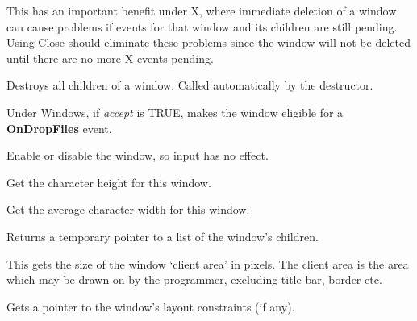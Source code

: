 This has an important benefit under X, where immediate deletion of a window can cause problems if events
for that window and its children are still pending. Using Close should eliminate these problems
since the window will not be deleted until there are no more X events pending.



Destroys all children of a window.  Called automatically by the destructor.

\label{wxwindowdragacceptfiles}


Under Windows, if {\it accept} is TRUE, makes the window eligible for a {\bf OnDropFiles} event.



Enable or disable the window, so input has no effect.



Get the character height for this window.



Get the average character width for this window.



Returns a temporary pointer to a list of the window's children.

\label{wingetclientsize}


This gets the size of the window `client area' in pixels.  The client area is the
area which may be drawn on by the programmer, excluding title bar, border etc.

\label{wxwindowgetconstraints}


Gets a pointer to the window's layout constraints (if any).

